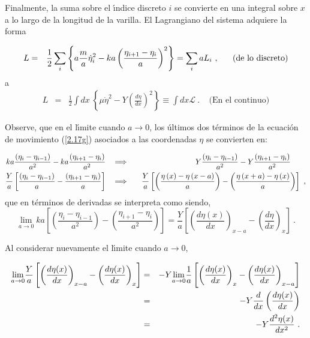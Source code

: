 \noindent
Finalmente, la suma sobre el \'{\i}ndice discreto $i$ se convierte en una integral sobre $x$ a lo largo de la longitud de la varilla. El Lagrangiano del sistema adquiere la forma

\begin{eqnarray}
L &=&\frac{1}{2}\sum\limits_{i}\left\{ a\frac{m}{a}\dot{\eta}_{i}^{2}-ka\left( \frac{\eta _{i+1}-\eta _{i}}{a}\right) ^{2}\right\}=\sum\limits_{i}aL_{i}~,~~~~~\text{(de lo discreto)}  \notag 
\end{eqnarray}
\noindent a
\begin{eqnarray}
L &=&\frac{1}{2}\int dx\ \left\{ \mu \dot{\eta}^{2}-Y\left( \frac{d\eta }{dx}\right) ^{2}\right\} \equiv \int dx  \mathcal{L}~.~~~~~\text{(En el continuo)}  \label{2.17h}
\end{eqnarray}

\vspace{0.3cm}
\noindent
Observe, que en el l\'{\i}mite cuando $a\rightarrow 0$, los \'{u}ltimos dos t\'{e}rminos de la ecuaci\'{o}n de movimiento (\ref{2.17g}) asociados a las coordenadas $\eta $ se convierten en:

\begin{eqnarray*}
ka\frac{\left(\eta _{i}-\eta _{i-1}\right) }{a^{2}}-ka\frac{\left(\eta_{i+1}-\eta_{i}\right) }{a^{2}}~\ &\implies &~\ \ Y\frac{\left( \eta_{i}-\eta_{i-1}\right) }{a^{2}}-Y\frac{\left( \eta _{i+1}-\eta_{i}\right) }{a^{2}}\qquad  \notag \\
\frac{Y}{a}\left[ \frac{\left( \eta_{i}-\eta _{i-1}\right) }{a}-\frac{\left( \eta_{i+1}-\eta_{i}\right) }{a}\right] ~\ &\implies &~\ \frac{Y}{a}\left[ \left( \frac{\eta \left( x\right) -\eta \left( x-a\right) }{a}\right)-\left( \frac{\eta \left( x+a\right) -\eta \left( x\right) }{a}\right)\right] ~,  \label{2.17i}
\end{eqnarray*}
\noindent
que en términos de derivadas se interpreta como siendo,
\begin{equation*}
\lim_{a\rightarrow 0}ka\left[ \left( \frac{\eta _{i}-\eta _{i-1}}{a^{2}}\right) -\left( \frac{\eta _{i+1}-\eta _{i}}{a^{2}}\right) \right] =\frac{Y}{a}\left[ \left( \frac{d\eta \left( x\right) }{dx}\right) _{x-a}-\left( \frac{d\eta}{dx}\right) _{x}\right]~.
\end{equation*}

\noindent
Al considerar nuevamente el l\'{\i}mite cuando $a\rightarrow 0$,

\begin{eqnarray}
\underset{a\rightarrow 0}{\lim }\frac{Y}{a}\left[ \left( \frac{d\eta (x)}{dx}\right) _{x-a}-\left( \frac{d\eta (x)}{dx}\right) _{x}\right] &=&-Y\underset{a\rightarrow 0}{\lim }\frac{1}{a}\left[ \left( \frac{d\eta (x)}{dx}\right)_{x}-\left( \frac{d\eta (x)}{dx}\right) _{x-a}\right]  \notag \\
&=&-Y\frac{d}{dx}\left( \frac{d\eta (x)}{dx}\right) \notag \\
&=&-Y\frac{d^{2}\eta (x)}{dx^{2}}~.  \label{2.17j}
\end{eqnarray}

